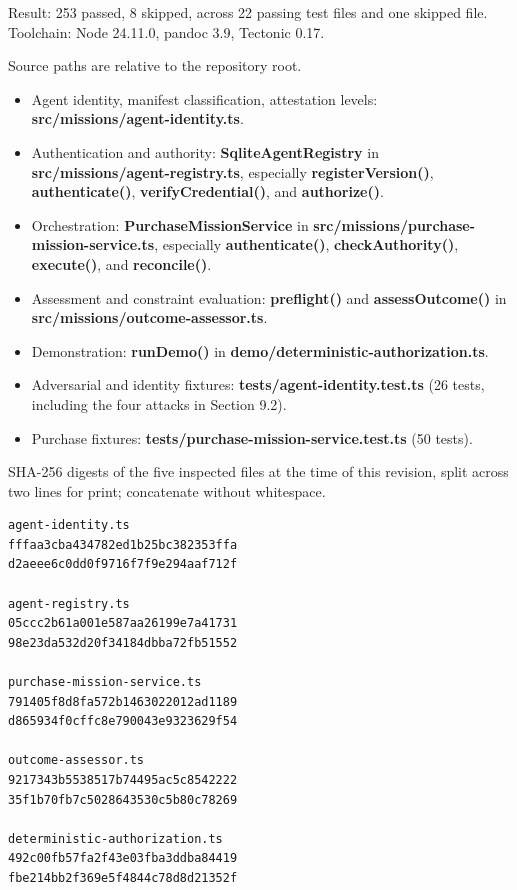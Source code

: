 \documentclass[
  11pt,
  letterpaper,
]{article}
\providecommand{\tightlist}{%
  \setlength{\itemsep}{0pt}\setlength{\parskip}{0pt}}
\begin{document}
Result: 253 passed, 8 skipped, across 22 passing test files and one
skipped file. Toolchain: Node 24.11.0, pandoc 3.9, Tectonic 0.17.

Source paths are relative to the repository root.

\begin{itemize}
\tightlist
\item
  Agent identity, manifest classification, attestation levels:
  \textbf{src/missions/agent-identity.ts}.
\item
  Authentication and authority: \textbf{SqliteAgentRegistry} in
  \textbf{src/missions/agent-registry.ts}, especially
  \textbf{registerVersion()}, \textbf{authenticate()},
  \textbf{verifyCredential()}, and \textbf{authorize()}.
\item
  Orchestration: \textbf{PurchaseMissionService} in
  \textbf{src/missions/purchase-mission-service.ts}, especially
  \textbf{authenticate()}, \textbf{checkAuthority()},
  \textbf{execute()}, and \textbf{reconcile()}.
\item
  Assessment and constraint evaluation: \textbf{preflight()} and
  \textbf{assessOutcome()} in \textbf{src/missions/outcome-assessor.ts}.
\item
  Demonstration: \textbf{runDemo()} in
  \textbf{demo/deterministic-authorization.ts}.
\item
  Adversarial and identity fixtures:
  \textbf{tests/agent-identity.test.ts} (26 tests, including the four
  attacks in Section 9.2).
\item
  Purchase fixtures: \textbf{tests/purchase-mission-service.test.ts} (50
  tests).
\end{itemize}

SHA-256 digests of the five inspected files at the time of this
revision, split across two lines for print; concatenate without
whitespace.

\begin{verbatim}
agent-identity.ts
fffaa3cba434782ed1b25bc382353ffa
d2aeee6c0dd0f9716f7f9e294aaf712f

agent-registry.ts
05ccc2b61a001e587aa26199e7a41731
98e23da532d20f34184dbba72fb51552

purchase-mission-service.ts
791405f8d8fa572b1463022012ad1189
d865934f0cffc8e790043e9323629f54

outcome-assessor.ts
9217343b5538517b74495ac5c8542222
35f1b70fb7c5028643530c5b80c78269

deterministic-authorization.ts
492c00fb57fa2f43e03fba3ddba84419
fbe214bb2f369e5f4844c78d8d21352f
\end{verbatim}
\end{document}
